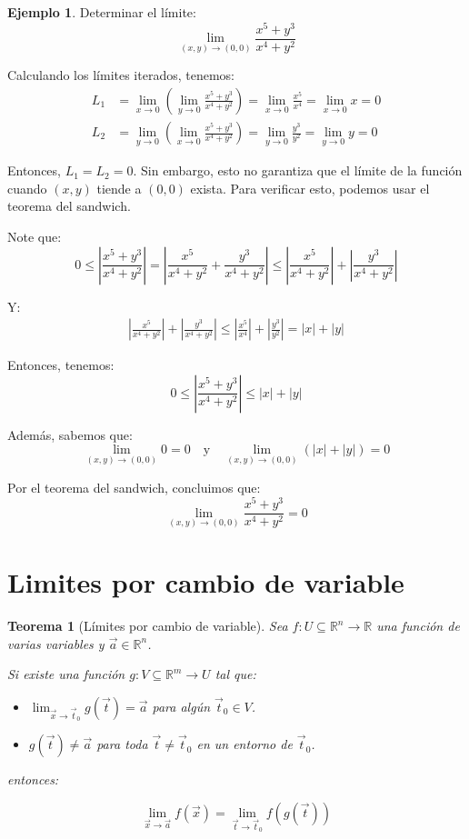 \documentclass{article}
\newcommand{\R}{\mathbb{R}}
\newcommand{\vect}[1]{\vec{#1}}
\theoremstyle{definition}
\newtheorem{example}[definition]{Ejemplo}
\theoremstyle{plain}
\newtheorem{theorem}[definition]{Teorema}
\theoremstyle{remark}
\theoremstyle{corollary}
\begin{document}
\begin{example}
Determinar el límite:
\[
\lim_{(x, y) \to (0, 0)} \frac{x^5 + y^3}{x^4 + y^2}
\]

Calculando los límites iterados, tenemos:
\begin{align*}
L_1 &= \lim_{x \to 0} \left( \lim_{y \to 0} \frac{x^5 + y^3}{x^4 + y^2} \right) = \lim_{x \to 0} \frac{x^5}{x^4} = \lim_{x \to 0} x = 0 \\
L_2 &= \lim_{y \to 0} \left(\lim_{x \to 0} \frac{x^5 + y^3}{x^4 + y^2} \right) = \lim_{y \to 0} \frac{y^3}{y^2} = \lim_{y \to 0} y = 0
\end{align*}

Entonces, $L_1 = L_2 = 0$. Sin embargo, esto no garantiza que el límite de la función cuando $(x, y)$ tiende a $(0, 0)$ exista. Para verificar esto, podemos usar el teorema del sandwich.

Note que:
\[
0 \leq \left| \frac{x^5 + y^3}{x^4 + y^2} \right| = \left| \frac{x^5}{x^4 + y^2} + \frac{y^3}{x^4 + y^2} \right| \leq \left| \frac{x^5}{x^4 + y^2} \right| + \left| \frac{y^3}{x^4 + y^2} \right|
\]

Y:
\begin{align*}
\left| \frac{x^5}{x^4 + y^2} \right| + \left| \frac{y^3}{x^4 + y^2} \right| \leq \left| \frac{x^5}{x^4} \right| + \left| \frac{y^3}{y^2} \right| = |x| + |y|
\end{align*}

Entonces, tenemos:
\[
0 \leq \left| \frac{x^5 + y^3}{x^4 + y^2} \right| \leq |x| + |y|
\]

Además, sabemos que:
\[
\lim_{(x, y) \to (0, 0)} 0 = 0 \quad \text{y} \quad \lim_{(x, y) \to (0, 0)} (|x| + |y|) = 0
\]

Por el teorema del sandwich, concluimos que:
\[
\lim_{(x, y) \to (0, 0)} \frac{x^5 + y^3}{x^4 + y^2} = 0
\]

\end{example}

\section{Limites por cambio de variable}

\begin{theorem}[Límites por cambio de variable]
Sea $f : U \subseteq \R^n \to \R$ una función de varias variables y $\vect{a} \in \R^n$.

Si existe una función $g : V \subseteq \R^m \to U$ tal que:

\begin{itemize}
\item $\lim_{\vect{x} \to \vect{t}_0} g(\vect{t}) = \vect{a}$ para algún $\vect{t}_0 \in V$.
\item $g(\vect{t}) \neq \vect{a}$ para toda $\vect{t} \neq \vect{t}_0$ en un entorno de $\vect{t}_0$.
\end{itemize} 

entonces:

\[
\lim_{\vect{x} \to \vect{a}} f(\vect{x}) = \lim_{\vect{t} \to \vect{t}_0} f(g(\vect{t}))
\]

\end{theorem}
\end{document}
